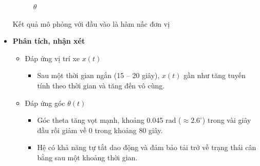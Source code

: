 \documentclass[12pt,a4paper]{article}
\begin{document}
\begin{itemize}
{\begin{subfigure}[b]{0.495\linewidth}
            \caption{$\theta$}
        \end{subfigure}
        \caption{Kết quả mô phỏng với đầu vào là hàm nấc đơn vị}
    }
    \item \textbf{Phân tích, nhận xét}
    \begin{itemize}
        \item Đáp ứng vị trí xe $x(t)$
        \begin{itemize}
            \item Sau một thời gian ngắn (15 -- 20 giây), $x(t)$ gần như tăng tuyến tính theo thời gian và tăng đến vô cùng. 
        \end{itemize}
        \item Đáp ứng góc $\theta(t)$
        \begin{itemize}
            \item Góc theta tăng vọt mạnh, khoảng 0.045 rad ($\approx 2.6^\circ$) trong vài giây đầu rồi giảm về 0 trong khoảng 80 giây.
            \item Hệ có khả năng tự tắt dao động và đảm bảo tải trở về trạng thái cân bằng sau một khoảng thời gian.
        \end{itemize}
    \end{itemize}
\end{itemize}
\end{document}

